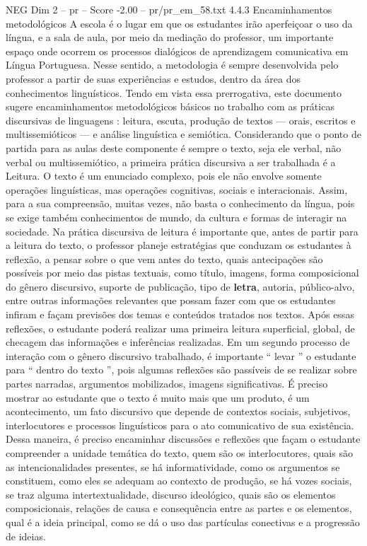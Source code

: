 \begin{textsample}{NEG Dim 2 – pr – Score -2.00 – pr/pr\_em\_58.txt}  \label{ex:f2_neg_171}
4.4.3 Encaminhamentos metodológicos A escola é o lugar em que os estudantes irão aperfeiçoar o uso da língua, e a sala de aula, por meio da mediação do professor, um importante espaço onde ocorrem os processos dialógicos de aprendizagem comunicativa em Língua Portuguesa.
Nesse sentido, a metodologia é sempre desenvolvida pelo professor a partir de suas experiências e estudos, dentro da área dos conhecimentos linguísticos.
Tendo em vista essa prerrogativa, este documento sugere encaminhamentos metodológicos básicos no trabalho com as práticas discursivas de linguagens : leitura, escuta, produção de textos — orais, escritos e multissemióticos — e análise linguística e semiótica.
Considerando que o ponto de partida para as aulas deste componente é sempre o texto, seja ele verbal, não verbal ou multissemiótico, a primeira prática discursiva a ser trabalhada é a Leitura.
O texto é um enunciado complexo, pois ele não envolve somente operações linguísticas, mas operações cognitivas, sociais e interacionais.
Assim, para a sua compreensão, muitas vezes, não basta o conhecimento da língua, pois se exige também conhecimentos de mundo, da cultura e formas de interagir na sociedade.
Na prática discursiva de leitura é importante que, antes de partir para a leitura do texto, o professor planeje estratégias que conduzam os estudantes à reflexão, a pensar sobre o que vem antes do texto, quais antecipações são possíveis por meio das pistas textuais, como título, imagens, forma composicional do gênero discursivo, suporte de publicação, tipo de \textbf{letra}, autoria, público-alvo, entre outras informações relevantes que possam fazer com que os estudantes infiram e façam previsões dos temas e conteúdos tratados nos textos.
Após essas reflexões, o estudante poderá realizar uma primeira leitura superficial, global, de checagem das informações e inferências realizadas.
Em um segundo processo de interação com o gênero discursivo trabalhado, é importante “ levar ” o estudante para “ dentro do texto ”, pois algumas reflexões são passíveis de se realizar sobre partes narradas, argumentos mobilizados, imagens significativas.
É preciso mostrar ao estudante que o texto é muito mais que um produto, é um acontecimento, um fato discursivo que depende de contextos sociais, subjetivos, interlocutores e processos linguísticos para o ato comunicativo de sua existência.
Dessa maneira, é preciso encaminhar discussões e reflexões que façam o estudante compreender a unidade temática do texto, quem são os interlocutores, quais são as intencionalidades presentes, se há informatividade, como os argumentos se constituem, como eles se adequam ao contexto de produção, se há vozes sociais, se traz alguma intertextualidade, discurso ideológico, quais são os elementos composicionais, relações de causa e consequência entre as partes e os elementos, qual é a ideia principal, como se dá o uso das partículas conectivas e a progressão de ideias.

\end{textsample}
